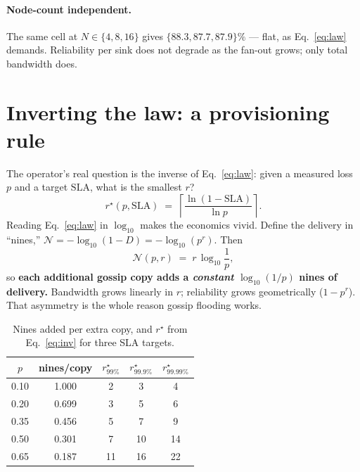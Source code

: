 \documentclass[10pt,twocolumn]{article}
\begin{document}
\paragraph{Node-count independent.}
The same cell at $N\in\{4,8,16\}$ gives $\{88.3,87.7,87.9\}\%$ --- flat, as
Eq.~\eqref{eq:law} demands. Reliability per sink does not degrade as the fan-out
grows; only total bandwidth does.

\section{Inverting the law: a provisioning rule}
The operator's real question is the inverse of Eq.~\eqref{eq:law}: given a
measured loss $p$ and a target $\mathrm{SLA}$, what is the smallest $r$?
\begin{equation}
r^{\star}(p,\mathrm{SLA}) \;=\;
\left\lceil \frac{\ln(1-\mathrm{SLA})}{\ln p} \right\rceil .
\label{eq:inv}
\end{equation}
Reading Eq.~\eqref{eq:law} in $\log_{10}$ makes the economics vivid. Define the
delivery in ``nines,'' $\mathcal{N}=-\log_{10}(1-D)=-\log_{10}(p^{r})$. Then
\begin{equation}
\mathcal{N}(p,r) \;=\; r\,\log_{10}\!\frac1p ,
\end{equation}
so \textbf{each additional gossip copy adds a \emph{constant} $\log_{10}(1/p)$
nines of delivery.} Bandwidth grows linearly in $r$; reliability grows
geometrically ($1-p^r$). That asymmetry is the whole reason gossip flooding works.

\begin{table}[h]\centering\small
\caption{Nines added per extra copy, and $r^{\star}$ from Eq.~\eqref{eq:inv}
for three SLA targets.}
\label{tab:rstar}
\begin{tabular}{ccccc}
\toprule
$p$ & nines/copy & $r^{\star}_{99\%}$ & $r^{\star}_{99.9\%}$ & $r^{\star}_{99.99\%}$\\
\midrule
0.10 & 1.000 & 2 & 3 & 4\\
0.20 & 0.699 & 3 & 5 & 6\\
0.35 & 0.456 & 5 & 7 & 9\\
0.50 & 0.301 & 7 & 10 & 14\\
0.65 & 0.187 & 11 & 16 & 22\\
\bottomrule
\end{tabular}
\end{table}
\end{document}
